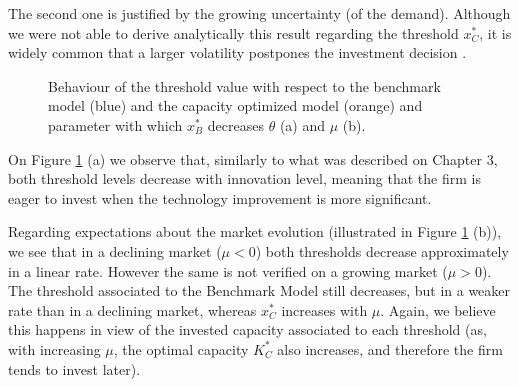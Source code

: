 The second one is justified by the growing uncertainty (of the demand). Although we were not able to derive analytically this result regarding the threshold $x_C^*$, it is widely common that a larger volatility postpones the investment decision \cite{dixit:book}. 


\begin{figure}[!htb]
	\begin{subfigmatrix}{2}
	\end{subfigmatrix}
	\caption{Behaviour of the threshold value with respect to the benchmark model (blue) and the capacity optimized model (orange) and parameter with which  $x^*_B$ decreases $\theta$ (a) and $\mu$ (b).}
	\label{fig:2_x3}
\end{figure}



On Figure \ref{fig:2_x3} (a) we observe that, similarly to what was described on Chapter 3, both threshold levels decrease with innovation level, meaning that the firm is eager to invest when the technology improvement is more significant.

Regarding expectations about the market evolution (illustrated in Figure \ref{fig:2_x3} (b)), we see that in a declining market ($\mu<0$) both thresholds decrease approximately in a linear rate. However the same is not verified on a growing market ($\mu>0$). The threshold associated to the Benchmark Model still decreases, but in a weaker rate than in a declining market, whereas $x^*_C$ increases with $\mu$. Again, we believe this happens in view of the invested capacity associated to each threshold (as, with increasing $\mu$, the optimal capacity $K^*_C$ also increases, and therefore the firm tends to invest later).

